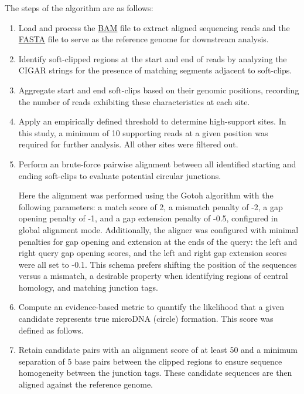 \documentclass[11pt, letterpaper]{article}
\begin{document}
The steps of the algorithm are as follows:
\begin{enumerate}
    \item Load and process the \href{}{BAM} file to extract aligned sequencing reads and the \href{}{FASTA} file to serve as the reference genome for downstream analysis.
    \item Identify soft-clipped regions at the start and end of reads by analyzing the CIGAR strings for the presence of matching segments adjacent to soft-clips.
    \item Aggregate start and end soft-clips based on their genomic positions, recording the number of reads exhibiting these characteristics at each site.
    \item Apply an empirically defined threshold to determine high-support sites. In this study, a minimum of 10 supporting reads at a given position was required for further analysis. All other sites were filtered out.
    \item Perform an brute-force pairwise alignment between all identified starting and ending soft-clips to evaluate potential circular junctions. 

    Here the alignment was performed using the Gotoh algorithm with the following parameters: a match score of 2, a mismatch penalty of -2, a gap opening penalty of -1, and a gap extension penalty of -0.5, configured in global alignment mode. Additionally, the aligner was configured with minimal penalties for gap opening and extension at the ends of the query: the left and right query gap opening scores, and the left and right gap extension scores were all set to -0.1. This schema prefers shifting the position of the sequences versus a mismatch, a desirable property when identifying regions of central homology, and matching junction tags. 
    \item Compute an evidence-based metric to quantify the likelihood that a given candidate represents true microDNA (circle) formation. This score was defined as follows.
    \item Retain candidate pairs with an alignment score of at least 50 and a minimum separation of 5 base pairs between the clipped regions to ensure sequence homogeneity between the junction tags. These candidate sequences are then aligned against the reference genome. 
    

\end{enumerate}
\end{document}
